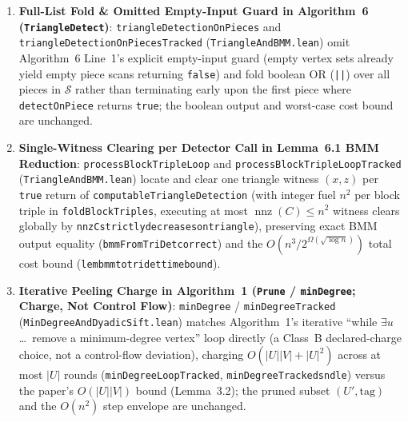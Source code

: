 \documentclass[10pt,letterpaper]{article}
\renewcommand{\_}{\origunderscore\allowbreak}
\newcommand{\code}[1]{\texttt{#1}}
\begin{document}
\begin{enumerate}
  \item \textbf{Full-List Fold \& Omitted Empty-Input Guard in Algorithm~6 (\code{TriangleDetect})}: \code{triangleDetectionOnPieces} and \code{triangleDetectionOnPiecesTracked} (\code{TriangleAndBMM.lean}) omit Algorithm~6 Line~1's explicit empty-input guard (empty vertex sets already yield empty piece scans returning \code{false}) and fold boolean OR (\code{||}) over all pieces in $\mathcal{S}$ rather than terminating early upon the first piece where \code{detectOnPiece} returns \code{true}; the boolean output and worst-case cost bound are unchanged.
  \item \textbf{Single-Witness Clearing per Detector Call in Lemma~6.1 BMM Reduction}: \code{processBlockTripleLoop} and \code{processBlockTripleLoopTracked} (\code{TriangleAndBMM.lean}) locate and clear one triangle witness $(x, z)$ per \code{true} return of \code{computableTriangleDetection} (with integer fuel $n^2$ per block triple in \code{foldBlockTriples}, executing at most $\operatorname{nnz}(C) \le n^2$ witness clears globally by \code{nnz\_C\_strictly\_decreases\_on\_triangle}), preserving exact BMM output equality (\code{bmmFromTriDet\_correct}) and the $O(n^3 / 2^{\Omega(\sqrt{\log n})})$ total cost bound (\code{lem\_bmm\_to\_tridet\_time\_bound}).
  \item \textbf{Iterative Peeling Charge in Algorithm~1 (\code{Prune} / \code{minDegree}; Charge, Not Control Flow)}: \code{minDegree} / \code{minDegreeTracked} (\code{MinDegreeAndDyadicSift.lean}) matches Algorithm~1's iterative ``while $\exists u$ \dots\ remove a minimum-degree vertex'' loop directly (a Class~B declared-charge choice, not a control-flow deviation), charging $O(|U||V| + |U|^2)$ across at most $|U|$ rounds (\code{minDegreeLoopTracked}, \code{minDegreeTracked\_snd\_le}) versus the paper's $O(|U||V|)$ bound (Lemma~3.2); the pruned subset $(U', \text{tag})$ and the $O(n^2)$ step envelope are unchanged.
\end{enumerate}
\end{document}

